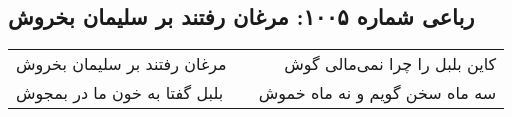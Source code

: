 \begin{center}
\section*{رباعی شماره ۱۰۰۵: مرغان رفتند بر سلیمان بخروش}
\label{sec:1005}
\begin{longtable}{l p{0.5cm} r}
مرغان رفتند بر سلیمان بخروش
&&
کاین بلبل را چرا نمی‌مالی گوش
\\
بلبل گفتا به خون ما در بمجوش
&&
سه ماه سخن گویم و نه ماه خموش
\\
\end{longtable}
\end{center}
